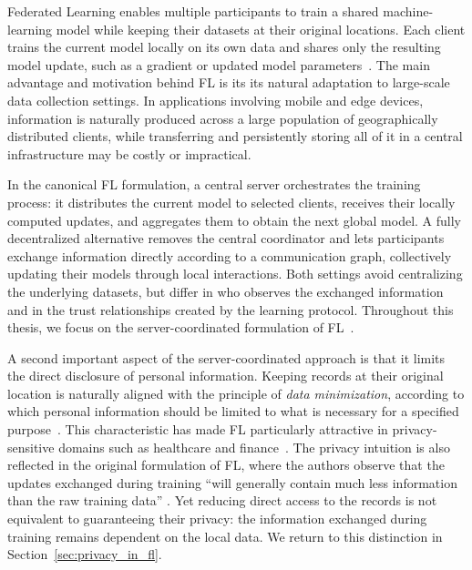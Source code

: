 Federated Learning enables multiple participants to train a shared machine-learning model while keeping their datasets at their original locations. Each client trains the current model locally on its own data and shares only the resulting model update, such as a gradient or updated model parameters~\cite{konecny2015federatedoptimizationdistributedoptimizationdatacenter, pmlr-v54-mcmahan17a}.
The main advantage and motivation behind  FL is its its natural adaptation to large-scale data collection settings. In applications involving mobile and edge devices, information is naturally produced across a large population of geographically distributed clients, while transferring and persistently storing all of it in a central infrastructure may be costly or impractical. 

 In the canonical FL formulation, a central server orchestrates the training process: it distributes the current model to selected clients, receives their locally computed updates, and aggregates them to obtain the next global model. A fully decentralized alternative removes the central coordinator and lets participants exchange information directly according to a communication graph, collectively updating their models through local interactions. Both settings avoid centralizing the underlying datasets, but differ in who observes the exchanged information and in the trust relationships created by the learning protocol. Throughout this thesis, we focus on the server-coordinated formulation of FL~\cite{pmlr-v54-mcmahan17a}.

A second important aspect of the server-coordinated approach is that it  limits the direct disclosure of personal information. Keeping records at their original location is naturally aligned with the principle of \emph{data minimization}, according to which personal information should be limited to what is necessary for a specified purpose~\cite{eu_gdpr_2016,eu_regulation_2018_1725,TRUONG2021102402}. This characteristic has made FL particularly attractive in privacy-sensitive domains such as healthcare and finance~\cite{Rieke2020,ZHANG2021106775,10.1145/3298981}. The privacy intuition is also reflected in the original formulation of FL, where the authors observe that the updates exchanged during training ``will generally contain much less information than the raw training data'' \cite{pmlr-v54-mcmahan17a}. Yet reducing direct access to the records is not equivalent to guaranteeing their privacy: the information exchanged during training remains dependent on the local data. We return to this distinction in Section~\ref{sec:privacy_in_fl}.




